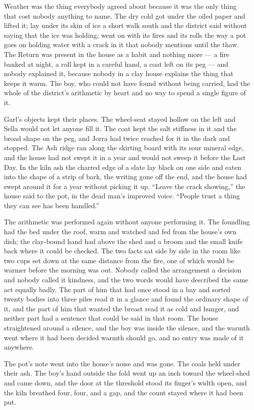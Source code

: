 Weather was the thing everybody agreed about because it was the only thing that cost nobody anything to name. The dry cold got under the oiled paper and lifted it;  lay under its skin of ice a short walk south and the district said without saying that the ice was holding;  went on with its fires and its rolls the way a pot goes on holding water with a crack in it that nobody mentions until the thaw. The Return was present in the house as a habit and nothing more --- a fire banked at night, a roll kept in a careful hand, a coat left on its peg --- and nobody explained it, because nobody in a clay house explains the thing that keeps it warm. The boy, who could not have found  without being carried, had the whole of the district's arithmetic by heart and no way to spend a single figure of it.

Garl's objects kept their places. The wheel-seat stayed hollow on the left and Sella would not let anyone fill it. The coat kept the salt stiffness in it and the broad shape on the peg, and Jorra had twice reached for it in the dark and stopped. The Ash ridge ran along the skirting board with its sour mineral edge, and the house had not swept it in a year and would not sweep it before the Last Day. In the kiln ash the charred edge of a slate lay black on one side and eaten into the shape of a strip of bark, the writing gone off the end, and the house had swept around it for a year without picking it up. “Leave the crack showing,” the house said to the pot, in the dead man's improved voice. “People trust a thing they can see has been handled.”

The arithmetic was performed again without anyone performing it. The foundling had the bed under the roof, warm and watched and fed from the house's own dish; the clay-bound hand had  above the shed and a broom and the small knife back where it could be checked. The two facts sat side by side in the room like two cups set down at the same distance from the fire, one of which would be warmer before the morning was out. Nobody called the arrangement a decision and nobody called it kindness, and the two words would have described the same act equally badly. The part of him that had once stood in a bay and sorted twenty bodies into three piles read it in a glance and found the ordinary shape of it, and the part of him that wanted the breast read it as cold and hunger, and neither part had a sentence that could be said in that room. The house straightened around a silence, and the boy was inside the silence, and the warmth went where it had been decided warmth should go, and no entry was made of it anywhere.

The pot's note went into the house's noise and was gone. The coals held under their ash. The boy's hand outside the fold went up an inch toward the wheel-shed and came down, and the door at the threshold stood its finger's width open, and the kiln breathed four, four, and a gap, and the count stayed where it had been put.

